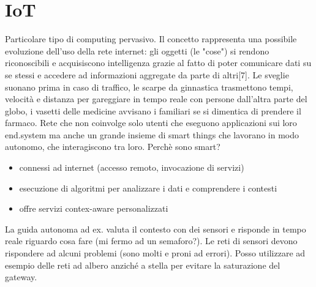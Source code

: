 \documentclass[12pt,italian]{report}
\begin{document}
\section{IoT}
Particolare tipo di computing pervasivo. Il concetto rappresenta una possibile evoluzione dell'uso della rete internet: gli oggetti (le "cose") si rendono riconoscibili e acquisiscono intelligenza grazie al fatto di poter comunicare dati su se stessi e accedere ad informazioni aggregate da parte di altri[7]. Le sveglie suonano prima in caso di traffico, le scarpe da ginnastica trasmettono tempi, velocità e distanza per gareggiare in tempo reale con persone dall'altra parte del globo, i vasetti delle medicine avvisano i familiari se si dimentica di prendere il farmaco.
\bigbreak
Rete che non coinvolge solo utenti che eseguono applicazioni sui loro end.system ma anche un grande insieme di smart things che lavorano in modo autonomo, che interagiscono tra loro. 
\bigbreak
Perchè sono smart?
\begin{itemize}
    \item connessi ad internet (accesso remoto, invocazione di servizi)
    \item esecuzione di algoritmi per analizzare i dati e comprendere i contesti
    \item offre servizi contex-aware personalizzati
\end{itemize}
La guida autonoma ad ex. valuta il contesto con dei sensori e risponde in tempo reale riguardo cosa fare (mi fermo ad un semaforo?). 
\bigbreak
Le reti di sensori devono rispondere ad alcuni problemi (sono molti e proni ad errori). Posso utilizzare ad esempio delle reti ad albero anziché a stella per evitare la saturazione del gateway. 
\end{document}
